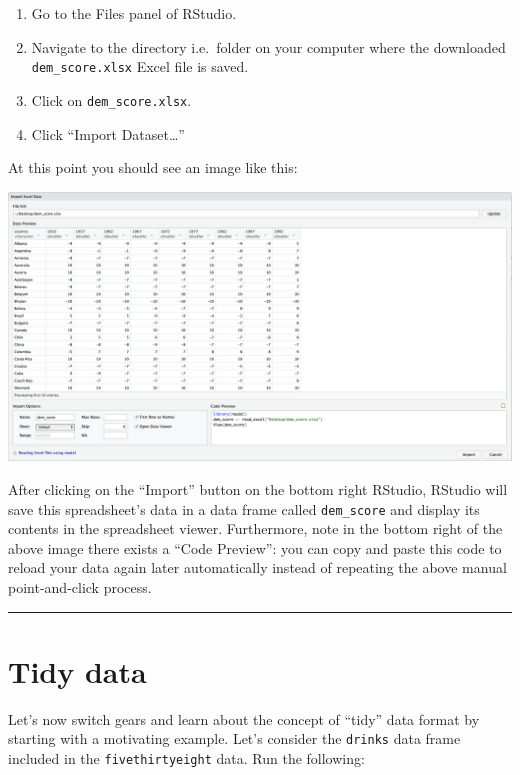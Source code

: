 \documentclass[12pt, krantz2,]{krantz}
\providecommand{\tightlist}{%
  \setlength{\itemsep}{0pt}\setlength{\parskip}{0pt}}
\begin{document}
\begin{enumerate}
\def\labelenumi{\arabic{enumi}.}
\tightlist
\item
  Go to the Files panel of RStudio.
\item
  Navigate to the directory i.e.~folder on your computer where the downloaded \texttt{dem\_score.xlsx} Excel file is saved.
\item
  Click on \texttt{dem\_score.xlsx}.
\item
  Click ``Import Dataset\ldots{}''
\end{enumerate}

At this point you should see an image like this:

\includegraphics{images/read_excel.png}

After clicking on the ``Import'' button on the bottom right RStudio, RStudio will save this spreadsheet's data in a data frame called \texttt{dem\_score} and display its contents in the spreadsheet viewer. Furthermore, note in the bottom right of the above image there exists a ``Code Preview'': you can copy and paste this code to reload your data again later automatically instead of repeating the above manual point-and-click process.

\begin{center}\rule{0.5\linewidth}{\linethickness}\end{center}

\hypertarget{tidy-data-ex}{%
\section{Tidy data}\label{tidy-data-ex}}

Let's now switch gears and learn about the concept of ``tidy'' data format by starting with a motivating example. Let's consider the \texttt{drinks} data frame included in the \texttt{fivethirtyeight} data. Run the following:
\end{document}
